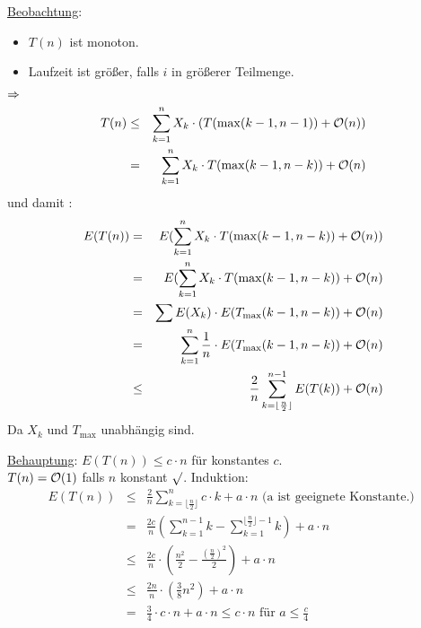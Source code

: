            \underline{Beobachtung}: 
            \begin{itemize}
                \item $T(n)$ ist monoton.
                \item Laufzeit ist größer, falls $i$ in größerer Teilmenge.
            \end{itemize}
            $\Ra $
            \begin{eqnarray*}
                T(n) & \leq &  \sum \limits_{k=1}^n X_k \cdot (T(\max(k-1, n-1))+ \mathcal{O}(n)) \\
                &=& \sum \limits_{k=1}^n X_k \cdot T(\max(k-1, n-k)) + \mathcal{O}(n) 
            \end{eqnarray*}
            und damit : \\
            \begin{eqnarray*}
                E(T(n)) &=& E( \sum \limits_{k=1}^n X_k \cdot T(\max (k-1, n-k)) + \mathcal{O}(n)) \\
                &=& E(\sum \limits_{k=1}^n X_k \cdot T(\max(k-1, n-k)) + \mathcal{O}(n) \\
                &=& \sum E(X_k) \cdot E(T_{\max} (k-1, n-k)) + \mathcal{O}(n) \\
                &=& \sum \limits_{k=1}^n \frac{1}{n} \cdot E(T_{\max} (k-1, n-k)) + \mathcal{O}(n) \\
                &\leq& \frac{2}{n} \sum \limits_{k= \lfloor \frac{n}{2} \rfloor}^{n-1} E(T(k)) + \mathcal{O}(n)
            \end{eqnarray*}
            Da $X_k$ und $T_{\max}$ unabhängig sind.
        
        \underline{Behauptung}: $E(T(n)) \leq c \cdot n$ für konstantes $c$. \\
        $T(n) = \mathcal{O}(1)$ falls $n$ konstant $\surd$. 
        Induktion: \\
          
        \begin{eqnarray*}
            E(T(n)) &\leq& \frac{2}{n} \sum \limits_{k=\lfloor \frac{n}{2} \rfloor}^n c \cdot k + a \cdot n \text{  (a ist geeignete Konstante.) } \\
            &=& \frac{2c}{n} ( \sum \limits_{k=1}^{n-1} k - \sum \limits_{k=1}^{\lfloor \frac{n}{2} \rfloor -1} k) + a \cdot n \\
            &\leq& \frac{2c}{n} \cdot (\frac{n^2}{2} - \frac{(\frac{n}{2})^2}{2} ) + a \cdot n \\
            &\leq & \frac{2n}{n} \cdot ( \frac{3}{8} n^2) + a \cdot n \\
            &=& \frac{3}{4} \cdot c \cdot n + a \cdot n \leq c \cdot n \text{ für } a \leq \frac{c}{4}
        \end{eqnarray*}
          
